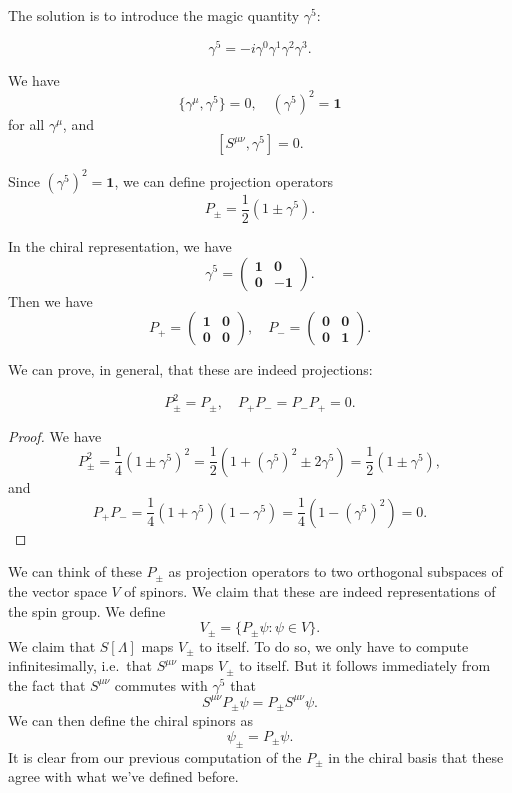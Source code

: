 \documentclass[a4paper]{article}
\begin{document}
The solution is to introduce the magic quantity $\gamma^5$:
\begin{defi}[$\gamma^5$]
  \[
    \gamma^5 = -i \gamma^0 \gamma^1 \gamma^2 \gamma^3.
  \]
\end{defi}

\begin{prop}
  We have
  \[
    \{\gamma^\mu, \gamma^5\} = 0,\quad (\gamma^5)^2 = \mathbf{1}
  \]
  for all $\gamma^\mu$, and
  \[
    [S^{\mu\nu}, \gamma^5] = 0.
  \]
\end{prop}

Since $(\gamma^5)^2 = \mathbf{1}$, we can define projection operators
\[
  P_{\pm} = \frac{1}{2}(1 \pm \gamma^5).
\]
\begin{eg}
  In the chiral representation, we have
  \[
    \gamma^5 =
    \begin{pmatrix}
      \mathbf{1} & \mathbf{0}\\
      \mathbf{0} & -\mathbf{1}
    \end{pmatrix}.
  \]
  Then we have
  \[
    P_+ =
    \begin{pmatrix}
      \mathbf{1} & \mathbf{0}\\
      \mathbf{0} & \mathbf{0}
    \end{pmatrix},
    \quad P_- =
    \begin{pmatrix}
      \mathbf{0} & \mathbf{0}\\
      \mathbf{0} & \mathbf{1}
    \end{pmatrix}.
  \]
\end{eg}
We can prove, in general, that these are indeed projections:
\begin{prop}
  \[
    P_\pm^2 = P_{\pm}, \quad P_+ P_- = P_- P_+ = 0.
  \]
\end{prop}

\begin{proof}
  We have
  \[
    P_{\pm}^2 = \frac{1}{4}(1 \pm \gamma^5)^2 = \frac{1}{2}(1 + (\gamma^5)^2 \pm 2 \gamma^5) = \frac{1}{2}(1 \pm \gamma^5),
  \]
  and
  \[
    P_+P_- = \frac{1}{4}(1 + \gamma^5)(1 - \gamma^5) = \frac{1}{4}(1 - (\gamma^5)^2) = 0.
  \]
\end{proof}
We can think of these $P_{\pm}$ as projection operators to two orthogonal subspaces of the vector space $V$ of spinors. We claim that these are indeed representations of the spin group. We define
\[
  V_{\pm} = \{P_{\pm} \psi: \psi \in V\}.
\]
We claim that $S[\Lambda]$ maps $V_{\pm}$ to itself. To do so, we only have to compute infinitesimally, i.e.\ that $S^{\mu\nu}$ maps $V_{\pm}$ to itself. But it follows immediately from the fact that $S^{\mu\nu}$ commutes with $\gamma^5$ that
\[
  S^{\mu\nu} P_{\pm}\psi = P_{\pm} S^{\mu\nu} \psi.
\]
We can then define the chiral spinors as
\[
  \psi_{\pm} = P_{\pm}\psi.
\]
It is clear from our previous computation of the $P_{\pm}$ in the chiral basis that these agree with what we've defined before.
\end{document}
